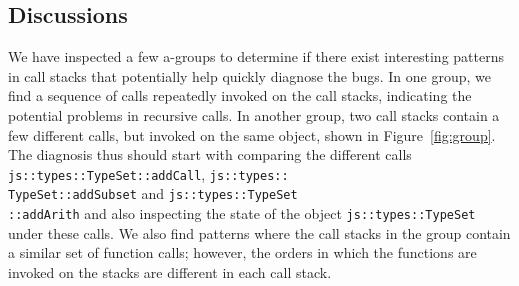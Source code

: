 \subsection{Discussions}
We have inspected a few a-groups to determine if there exist interesting patterns in call stacks that potentially help quickly diagnose the bugs. In one group,  we find a sequence of calls repeatedly invoked on the call stacks, indicating the potential problems in recursive calls. In another group, two call stacks contain a few different calls, but invoked on the same object, shown in Figure~\ref{fig:group}. The diagnosis thus should start with comparing the different calls {\tt js::types::TypeSet::addCall}, {\tt js::types::\\TypeSet::addSubset} and {\tt js::types::TypeSet\\::addArith} and also inspecting the state of the object {\tt js::types::TypeSet} under these calls. We also find patterns where the call stacks in the group contain a similar set of function calls; however, the orders in which the functions are invoked on the stacks are different in each call stack.



